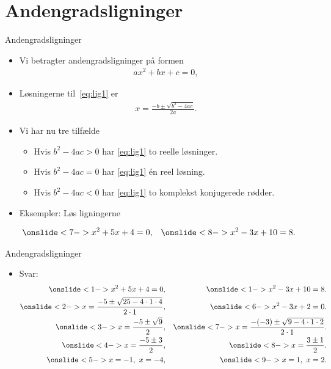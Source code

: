 \section{Andengradsligninger}
\begin{frame}{Andengradsligninger}
\begin{itemize}
		\setlength\itemsep{1em}
	\item<1-> Vi betragter andengradsligninger på formen
	\begin{align}\label{eq:lig1}
	ax^2+bx+c=0,
	\end{align}
	\item<2-> Løsningerne til~\eqref{eq:lig1} er
	\begin{align*}
	x=\frac{-b\pm \sqrt{b^2-4ac}}{2a}.
	\end{align*}
	\item<3-> Vi har nu tre tilfælde
	\begin{itemize}
			\setlength\itemsep{1em}
		\item<4-> Hvis $b^2-4ac>0$ har \eqref{eq:lig1} to reelle løsninger.
		\item<5-> Hvis $b^2-4ac=0$ har \eqref{eq:lig1} én reel løsning.
		\item<6-> Hvis $b^2-4ac<0$ har \eqref{eq:lig1} to komplekst konjugerede rødder.
	\end{itemize}
	\item<7-> Eksempler: Løs ligningerne
\end{itemize}
	\begin{align*}
\onslide<7->{x^2+5x+4=0,}&&\onslide<8->{x^2-3x+10=8.}
\end{align*}
\end{frame}
\setbeamercovered{} 
\begin{frame}{Andengradsligninger}
	\begin{itemize}
		\item Svar:
		\begin{align*}
	\onslide<1->{x^2+5x+4=0,}&&\onslide<1->{x^2-3x+10=8.}\\
	\onslide<2->{x=\frac{-5\pm \sqrt{25-4\cdot 1\cdot 4}}{2\cdot 1},}&&\onslide<6->{x^2-3x+2=0.}\\
	\onslide<3->{x=\frac{-5\pm \sqrt{9}}{2},}&&\onslide<7->{x=\frac{-(-3)\pm \sqrt{9-4\cdot 1\cdot 2}}{2\cdot 1}.}\\
	\onslide<4->{x=\frac{-5\pm 3}{2},}&&\onslide<8->{x=\frac{3\pm 1}{2}.}\\
	\onslide<5->{x=-1,\ x=-4,}&&\onslide<9->{x=1,\ x=2.}\\
		\end{align*}
	\end{itemize}
\end{frame}

